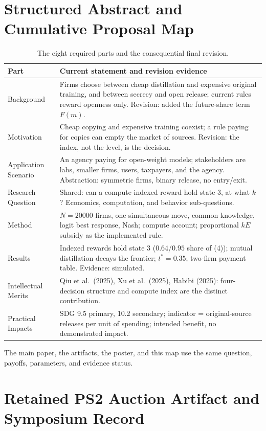 \section{Structured Abstract and Cumulative Proposal Map}\label{app:abstract}
\begin{table}[H]
\caption{The eight required parts and the consequential final revision.}
\renewcommand{\arraystretch}{1.15}
\begin{tabularx}{\textwidth}{@{}p{}Y@{}}\toprule
\textbf{Part}&\textbf{Current statement and revision evidence}\\\midrule
Background&Firms choose between cheap distillation and expensive original training, and between secrecy and open release; current rules reward openness only. Revision: added the future-share term $F(m)$.\\
Motivation&Cheap copying and expensive training coexist; a rule paying for copies can empty the market of sources. Revision: the index, not the level, is the decision.\\
Application Scenario&An agency paying for open-weight models; stakeholders are labs, smaller firms, users, taxpayers, and the agency. Abstraction: symmetric firms, binary release, no entry/exit.\\
Research Question&Shared: can a compute-indexed reward hold state 3, at what $k$? Economics, computation, and behavior sub-questions.\\
Method&$N=20000$ firms, one simultaneous move, common knowledge, logit best response, Nash; compute account; proportional $kE$ subsidy as the implemented rule.\\
Results&Indexed rewards hold state 3 ($0.64$/$0.95$ share of (4)); mutual distillation decays the frontier; $t^\ast=0.35$; two-firm payment table. Evidence: simulated.\\
Intellectual Merits&Qiu et al.\ (2025), Xu et al.\ (2025), Habibi (2025): four-decision structure and compute index are the distinct contribution.\\
Practical Impacts&SDG 9.5 primary, 10.2 secondary; indicator = original-source releases per unit of spending; intended benefit, no demonstrated impact.\\\bottomrule
\end{tabularx}\end{table}
\noindent The main paper, the artifacts, the poster, and this map use the same question, payoffs, parameters, and evidence status.

\clearpage\twocolumn
\section{Retained PS2 Auction Artifact and Symposium Record}
